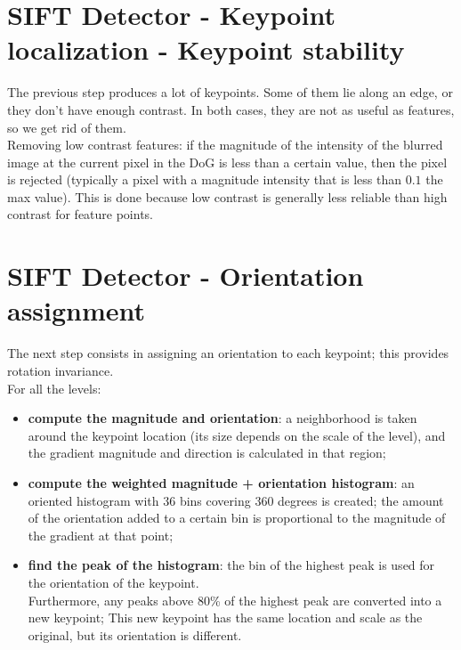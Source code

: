 \documentclass{article}
\begin{document}
\section*{SIFT Detector - Keypoint localization - Keypoint stability}

The previous step produces a lot of keypoints. Some of them lie along an edge, or they don’t have enough contrast. In both cases, they are not as useful as features, so we get rid of them. \\

Removing low contrast features: if the magnitude of the intensity of the blurred image at the current pixel in the DoG is less than a certain value, then the pixel is rejected (typically a pixel with a magnitude intensity that is less than $0.1$ the max value). This is done because low contrast is generally less reliable than high contrast for feature points. 

\newpage

\section*{SIFT Detector - Orientation assignment}

The next step consists in assigning an orientation to each keypoint; this provides rotation invariance. \\

For all the levels:
\begin{itemize}
    \item \textbf{compute the magnitude and orientation}: a neighborhood is taken around the keypoint location (its size depends on the scale of the level), and the gradient magnitude and direction is calculated in that region;
    \item \textbf{compute the weighted magnitude + orientation histogram}: an oriented histogram with $36$ bins covering $360$ degrees is created; the amount of the orientation added to a certain bin is proportional to the magnitude of the gradient at that point;
    \item \textbf{find the peak of the histogram}: the bin of the highest peak is used for the orientation of the keypoint. \\
    
    Furthermore, any peaks above 80\% of the highest peak are converted into a new keypoint; This new keypoint has the same location and scale as the original, but its orientation is different.
\end{itemize}
\end{document}
